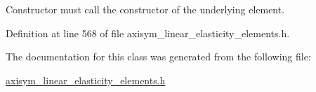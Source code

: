 Constructor must call the constructor of the underlying element. 



Definition at line 568 of file axisym\+\_\+linear\+\_\+elasticity\+\_\+elements.\+h.



The documentation for this class was generated from the following file\+:\begin{DoxyCompactItemize}
\item 
\hyperlink{axisym__linear__elasticity__elements_8h}{axisym\+\_\+linear\+\_\+elasticity\+\_\+elements.\+h}\end{DoxyCompactItemize}
